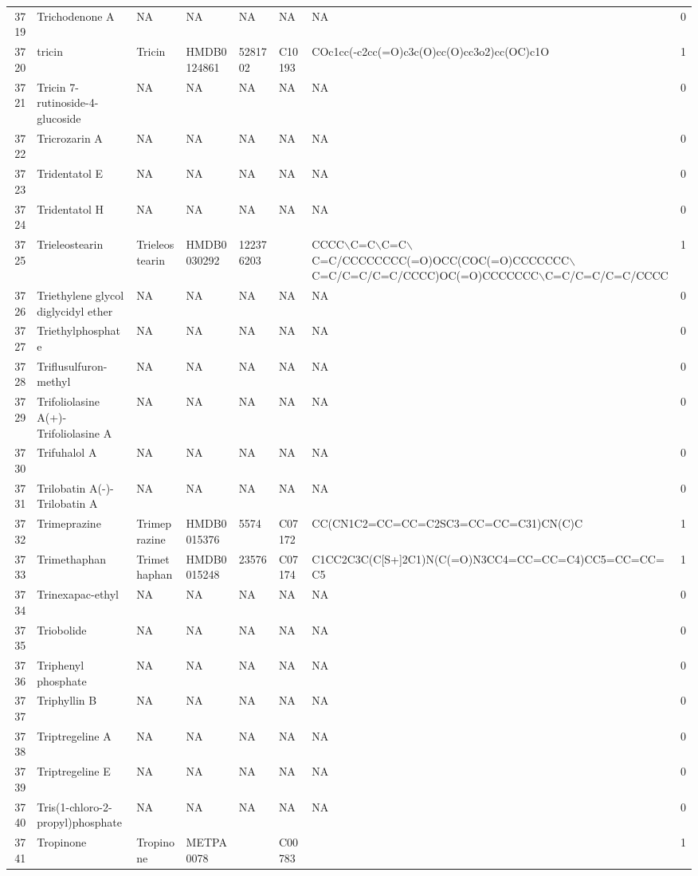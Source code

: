 \documentclass[a4paper]{article}
\begin{document}
\begin{longtable}{rlllllll}
  3719 & Trichodenone A & NA & NA & NA & NA & NA & 0 \\ 
  3720 & tricin & Tricin & HMDB0124861 & 5281702 & C10193 & COc1cc(-c2cc(=O)c3c(O)cc(O)cc3o2)cc(OC)c1O & 1 \\ 
  3721 & Tricin 7-rutinoside-4-glucoside & NA & NA & NA & NA & NA & 0 \\ 
  3722 & Tricrozarin A & NA & NA & NA & NA & NA & 0 \\ 
  3723 & Tridentatol E & NA & NA & NA & NA & NA & 0 \\ 
  3724 & Tridentatol H & NA & NA & NA & NA & NA & 0 \\ 
  3725 & Trieleostearin & Trieleostearin & HMDB0030292 & 122376203 &  & CCCC$\backslash$C=C$\backslash$C=C$\backslash$C=C/CCCCCCCC(=O)OCC(COC(=O)CCCCCCC$\backslash$C=C/C=C/C=C/CCCC)OC(=O)CCCCCCC$\backslash$C=C/C=C/C=C/CCCC & 1 \\ 
  3726 & Triethylene glycol diglycidyl ether & NA & NA & NA & NA & NA & 0 \\ 
  3727 & Triethylphosphate & NA & NA & NA & NA & NA & 0 \\ 
  3728 & Triflusulfuron-methyl & NA & NA & NA & NA & NA & 0 \\ 
  3729 & Trifoliolasine A(+)-Trifoliolasine A & NA & NA & NA & NA & NA & 0 \\ 
  3730 & Trifuhalol A & NA & NA & NA & NA & NA & 0 \\ 
  3731 & Trilobatin A(-)-Trilobatin A & NA & NA & NA & NA & NA & 0 \\ 
  3732 & Trimeprazine & Trimeprazine & HMDB0015376 & 5574 & C07172 & CC(CN1C2=CC=CC=C2SC3=CC=CC=C31)CN(C)C & 1 \\ 
  3733 & Trimethaphan & Trimethaphan & HMDB0015248 & 23576 & C07174 & C1CC2C3C(C[S+]2C1)N(C(=O)N3CC4=CC=CC=C4)CC5=CC=CC=C5 & 1 \\ 
  3734 & Trinexapac-ethyl & NA & NA & NA & NA & NA & 0 \\ 
  3735 & Triobolide & NA & NA & NA & NA & NA & 0 \\ 
  3736 & Triphenyl phosphate & NA & NA & NA & NA & NA & 0 \\ 
  3737 & Triphyllin B & NA & NA & NA & NA & NA & 0 \\ 
  3738 & Triptregeline A & NA & NA & NA & NA & NA & 0 \\ 
  3739 & Triptregeline E & NA & NA & NA & NA & NA & 0 \\ 
  3740 & Tris(1-chloro-2-propyl)phosphate & NA & NA & NA & NA & NA & 0 \\ 
  3741 & Tropinone & Tropinone & METPA0078 &  & C00783 &  & 1 \\ 

\end{longtable}
\end{document}
